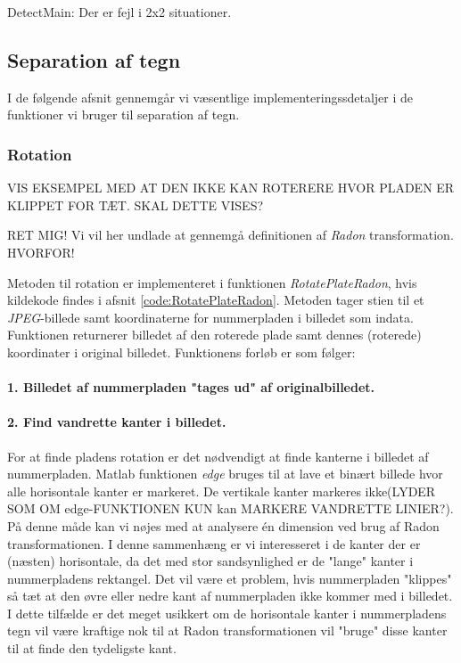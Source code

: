 DetectMain: Der er fejl i 2x2 situationer.



\subsection{Separation af tegn}

I de følgende afsnit gennemgår vi væsentlige implementeringssdetaljer i de funktioner vi bruger til separation af tegn. 

\subsubsection{Rotation}
\label{sec:implementation/sep/rotation}

VIS EKSEMPEL MED AT DEN IKKE KAN ROTERERE HVOR PLADEN ER KLIPPET FOR TÆT. SKAL DETTE VISES?

RET MIG!
Vi vil her undlade at gennemgå definitionen af \textit{Radon} transformation. HVORFOR!


Metoden til rotation er implementeret i funktionen \textit{RotatePlateRadon}, hvis kildekode findes i afsnit \vref{code:RotatePlateRadon}. Metoden tager stien til et \textit{JPEG}-billede samt koordinaterne for nummerpladen i billedet som indata. Funktionen returnerer billedet af den roterede plade samt dennes (roterede) koordinater i original billedet. Funktionens forløb er som følger:

\paragraph{1. Billedet af nummerpladen "tages ud" af originalbilledet.}
\paragraph{2. Find vandrette kanter i billedet.}
For at finde pladens rotation er det nødvendigt at finde kanterne i billedet af nummerpladen. Matlab funktionen \textit{edge} bruges til at lave et binært billede hvor alle horisontale kanter er markeret. De vertikale kanter markeres ikke(LYDER SOM OM edge-FUNKTIONEN KUN kan MARKERE VANDRETTE LINIER?). På denne måde kan vi nøjes med at analysere én dimension ved brug af Radon transformationen. I denne sammenhæng er vi interesseret i de kanter der er (næsten) horisontale, da det med stor sandsynlighed er de "lange" kanter i nummerpladens rektangel. Det vil være et problem, hvis nummerpladen "klippes" så tæt at den øvre eller nedre kant af nummerpladen ikke kommer med i billedet. I dette tilfælde er det meget usikkert om de horisontale kanter i nummerpladens tegn vil være kraftige nok til at Radon transformationen vil "bruge" disse kanter til at finde den tydeligste kant.

